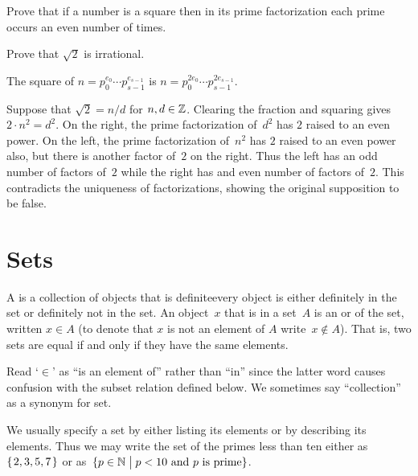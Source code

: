 \documentclass{ibl}  %
\begin{document}
\begin{ex} 
\begin{exes}
\item Prove that if a number is a square then in its prime factorization 
  each prime occurs an even number of times.
\item Prove that $\sqrt{2}$ is irrational.
\end{exes}
\begin{ans}
\begin{exes}
\item The square of $n=p_0^{e_0}\cdots p_{s-1}^{e_{s-1}}$ is
  $n=p_0^{2e_0}\cdots p_{s-1}^{2e_{s-1}}$.
\item Suppose that $\sqrt{2}=n/d$ for $n,d\in\mathbb{Z}$.
  Clearing the fraction and squaring gives $2\cdot n^2=d^2$.
  On the right, the prime factorization of~$d^2$ has $2$ raised to an even 
  power.
  On the left, the prime factorization of~$n^2$ has $2$ raised to an even power
  also, but there is another factor of~$2$ on the right.
  Thus the left has an odd number of factors of~$2$ while the right has
  and even number of factors of~$2$.
  This contradicts the uniqueness of factorizations, showing the 
  original supposition to be false. 
\end{exes}
\end{ans}
\end{ex}










\chapter{Sets}
\begin{df}
A  is a collection of objects that is definite\Dash every 
object is either
definitely in the set or definitely not in the set.
An object~$x$ that is in a set~$A$ is an 
or 
of the set, written $x\in A$
(to denote that $x$ is not an element of $A$ write~$x\notin A$).
That is, two sets are equal if and only if they have the same elements.
\end{df}
\noindent Read `$\in$' as ``is an element of'' rather than ``in'' since the 
latter word causes confusion with 
the subset relation defined below.
We sometimes say ``collection'' as a synonym for set.

We usually specify a set by either listing its elements or by
describing its elements.
Thus we may write 
the set of the primes less than ten 
either as $\mbox{$\{\hspace{0.1em}2, 3, 5, 7\hspace{0.1em}\}$}$ or as~$\{p\in\mathbb{N} \bigm| \text{$p<10$ and $p$ is prime}\}$.
\end{document}
